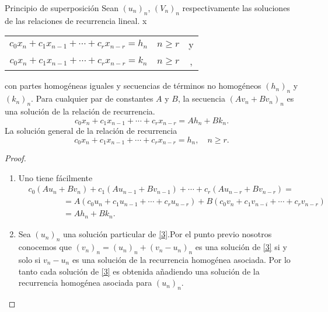 \begin{proposition}{Principio de superposición}
Sean $(u_{n})_n$, $(V_{n})_{n}$ respectivamente las soluciones de las relaciones de recurrencia lineal. x
\end{proposition}
\begin{tabular}{ccc}
$c_{0}x_{n}+c_{1}x_{n-1}+\cdots+c_{r}x_{n-r}=h_{n}$	&	$n\geq r$	&	y\\
$c_{0}x_{n}+c_{1}x_{n-1}+\cdots+c_{r}x_{n-r}=k_{n}$	&	$n\geq r$	&,\\
\end{tabular}
con partes homogéneas iguales y secuencias de términos no homogéneos $(h_{n})_{n}$ y $(k_{n})_{n}$. Para cualquier par de constantes $A$ y $B$, la secuencia $(Av_{n}+Bv_{n})_{n}$ es una solución de la relación de recurrencia.
\begin{equation*}
c_{0}x_{n}+c_{1}x_{n-1}+\cdots+c_{r}x_{n-r}=Ah_{n}+Bk_{n}.
\end{equation*}
La solución general de la relación de recurrencia
\begin{equation}\label{3}
c_{0}x_{n}+c_{1}x_{n-1}+\cdots+c_{r}x_{n-r}=h_{n},\quad n\geq r.
\end{equation}

\begin{proof}\leavevmode
\begin{enumerate}
\item Uno tiene fácilmente
\begin{equation*}
\begin{split}
&c_{0}(Au_{n}+Bv_{n})+c_{1}(Au_{n-1}+Bv_{n-1})+\cdots+c_{r}(Au_{n-r}+Bv_{n-r})=\\
&\phantom{c_{0}(Au_n+}=A(c_{0}u_{n}+c_{1}u_{n-1}+\cdots+c_{r}u_{n-r})+B(c_{0}v_{n}+c_{1}v_{n-i}+\cdots+c_{r}v_{n-r})\\
&\phantom{c_{0}(Au_n+}=Ah_{n}+Bk_{n}.
\end{split}
\end{equation*}
\item Sea $(u_{n})_{n}$ una solución particular de \eqref{3}.Por el punto previo nosotros conocemos que $(v_{n})_{n}=(u_{n})_{n}+(v_{n}-u_{n})_{n}$ es una solución de \eqref{3} si y solo si $v_{n}-u_{n}$ es una solución de la recurrencia homogénea asociada. Por lo tanto cada solución de \eqref{3} es obtenida añadiendo una solución de la  recurrencia homogénea asociada para $(u_{n})_{n}$.
\end{enumerate}
\end{proof}
